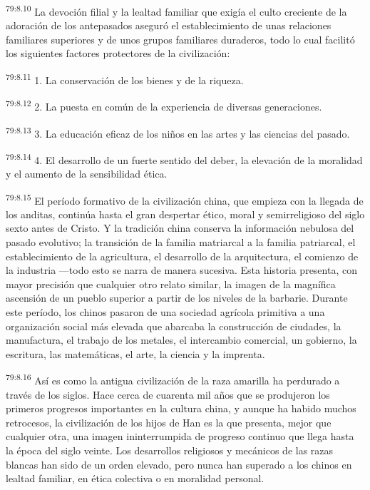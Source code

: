 \par
\textsuperscript{79:8.10} La devoción filial y la lealtad familiar que exigía el culto creciente de la adoración de los antepasados aseguró el establecimiento de unas relaciones familiares superiores y de unos grupos familiares duraderos, todo lo cual facilitó los siguientes factores protectores de la civilización:

\par
\textsuperscript{79:8.11} 1. La conservación de los bienes y de la riqueza.

\par
\textsuperscript{79:8.12} 2. La puesta en común de la experiencia de diversas generaciones.

\par
\textsuperscript{79:8.13} 3. La educación eficaz de los niños en las artes y las ciencias del pasado.

\par
\textsuperscript{79:8.14} 4. El desarrollo de un fuerte sentido del deber, la elevación de la moralidad y el aumento de la sensibilidad ética.

\par
\textsuperscript{79:8.15} El período formativo de la civilización china, que empieza con la llegada de los anditas, continúa hasta el gran despertar ético, moral y semirreligioso del siglo sexto antes de Cristo. Y la tradición china conserva la información nebulosa del pasado evolutivo; la transición de la familia matriarcal a la familia patriarcal, el establecimiento de la agricultura, el desarrollo de la arquitectura, el comienzo de la industria ---todo esto se narra de manera sucesiva. Esta historia presenta, con mayor precisión que cualquier otro relato similar, la imagen de la magnífica ascensión de un pueblo superior a partir de los niveles de la barbarie. Durante este período, los chinos pasaron de una sociedad agrícola primitiva a una organización social más elevada que abarcaba la construcción de ciudades, la manufactura, el trabajo de los metales, el intercambio comercial, un gobierno, la escritura, las matemáticas, el arte, la ciencia y la imprenta.

\par
\textsuperscript{79:8.16} Así es como la antigua civilización de la raza amarilla ha perdurado a través de los siglos. Hace cerca de cuarenta mil años que se produjeron los primeros progresos importantes en la cultura china, y aunque ha habido muchos retrocesos, la civilización de los hijos de Han es la que presenta, mejor que cualquier otra, una imagen ininterrumpida de progreso continuo que llega hasta la época del siglo veinte. Los desarrollos religiosos y mecánicos de las razas blancas han sido de un orden elevado, pero nunca han superado a los chinos en lealtad familiar, en ética colectiva o en moralidad personal.

